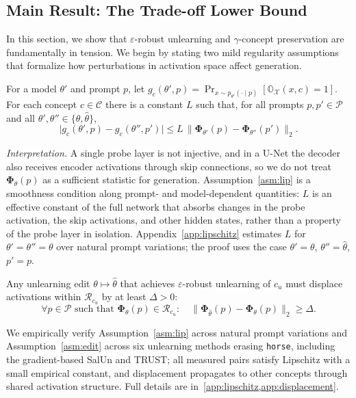 \subsection{Main Result: The Trade-off Lower Bound}
\label{subsec:main_result}

In this section, we show that $\varepsilon$-robust unlearning and $\gamma$-concept preservation are fundamentally in tension.
We begin by stating two mild regularity assumptions that formalize how perturbations in activation space affect generation.

\begin{assumption}\label{asm:lip}
For a model $\theta'$ and prompt $p$, let
$g_c(\theta',p)=\Pr_{x\sim p_{\theta'}(\cdot\mid p)}[\mathbb{O}_{\mathcal{X}}(x,c)=1]$.
For each concept $c\in\mathcal{C}$ there is a constant $L$ such that, for all
prompts $p,p'\in\mathcal{P}$ and all $\theta',\theta''\in\{\theta,\hat\theta\}$,
\begin{equation}
  \bigl|g_c(\theta',p)-g_c(\theta'',p')\bigr|
  \le L\,\bigl\|\boldsymbol{\Phi}_{\theta'}(p)-\boldsymbol{\Phi}_{\theta''}(p')\bigr\|_2 .
\end{equation}
\end{assumption}
\noindent\emph{Interpretation.} A single probe layer is not injective, and in a
U-Net the decoder also receives encoder activations through skip connections, so
we do not treat $\boldsymbol{\Phi}_\theta(p)$ as a sufficient statistic for generation.
Assumption~\ref{asm:lip} is a smoothness condition along prompt- and
model-dependent quantities: $L$ is an effective constant of the full network
that absorbs changes in the probe activation, the skip activations, and other
hidden states, rather than a property of the probe layer in isolation.
Appendix~\ref{app:lipschitz} estimates $L$ for $\theta'=\theta''=\theta$ over
natural prompt variations; the proof uses the case $\theta'=\theta$,
$\theta''=\hat\theta$, $p'=p$.

\begin{assumption}
\label{asm:edit}
Any unlearning edit $\theta \mapsto \hat{\theta}$ that achieves $\varepsilon$-robust unlearning of $c_u$ must displace activations within $\mathcal{R}_{c_u}$ by at least $\Delta>0$:
\begin{equation}
\label{eq:delta_lower}
    \forall p \in \mathcal{P}
    \text{ such that }
    \boldsymbol{\Phi}_{\theta}(p)\in \mathcal{R}_{c_u}:
    \quad
    \|\boldsymbol{\Phi}_{\hat{\theta}}(p)-\boldsymbol{\Phi}_{\theta}(p)\|_2
    \geq
    \Delta .
\end{equation}
\end{assumption}
We empirically verify Assumption~\ref{asm:lip} across natural prompt variations and Assumption~\ref{asm:edit} across six unlearning methods erasing \texttt{horse}, including the gradient-based SalUn and TRUST; all measured pairs satisfy Lipschitz with a small empirical constant, 
and displacement propagates to other concepts through shared activation structure.
Full details are in~\cref{app:lipschitz,app:displacement}.


